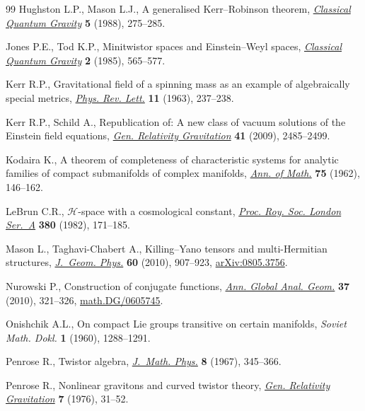 \documentclass[10pt,a4paper]{amsart}
\providecommand{\cal}{\mathcal}
\numberwithin{equation}{section}
\begin{document}
\begin{thebibliography}{99}
Hughston L.P., Mason L.J., A generalised {K}err--{R}obinson theorem,
 \href{http://dx.doi.org/10.1088/0264-9381/5/2/007}{\textit{Classical Quantum Gravity}} \textbf{5} (1988), 275--285.

Jones P.E., Tod K.P., Minitwistor spaces and {E}instein--{W}eyl spaces,
 \href{http://dx.doi.org/10.1088/0264-9381/2/4/021}{\textit{Classical Quantum Gravity}} \textbf{2} (1985), 565--577.

Kerr R.P., Gravitational f\/ield of a spinning mass as an example of
 algebraically special metrics, \href{http://dx.doi.org/10.1103/PhysRevLett.11.237}{\textit{Phys. Rev. Lett.}} \textbf{11} (1963),
 237--238.

Kerr R.P., Schild A., Republication of: {A} new class of vacuum solutions of
 the {E}instein f\/ield equations, \href{http://dx.doi.org/10.1007/s10714-009-0857-z}{\textit{Gen. Relativity Gravitation}}
 \textbf{41} (2009), 2485--2499.

Kodaira K., A theorem of completeness of characteristic systems for analytic
 families of compact submanifolds of complex manifolds, \href{http://dx.doi.org/10.2307/1970424}{\textit{Ann. of Math.}}
 \textbf{75} (1962), 146--162.

LeBrun C.R., {${\cal H}$}-space with a cosmological constant, \href{http://dx.doi.org/10.1098/rspa.1982.0035}{\textit{Proc.
 Roy. Soc. London Ser.~A}} \textbf{380} (1982), 171--185.

Mason L., Taghavi-Chabert A., Killing--{Y}ano tensors and multi-{H}ermitian
 structures, \href{http://dx.doi.org/10.1016/j.geomphys.2010.02.008}{\textit{J.~Geom. Phys.}} \textbf{60} (2010), 907--923,
 \href{http://arxiv.org/abs/0805.3756}{arXiv:0805.3756}.

Nurowski P., Construction of conjugate functions, \href{http://dx.doi.org/10.1007/s10455-009-9186-4}{\textit{Ann. Global Anal.
 Geom.}} \textbf{37} (2010), 321--326, \href{http://arxiv.org/abs/math.DG/0605745}{math.DG/0605745}.

Onishchik A.L., On compact {L}ie groups transitive on certain manifolds,
 \textit{Soviet Math. Dokl.} \textbf{1} (1960), 1288--1291.

Penrose R., Twistor algebra, \href{http://dx.doi.org/10.1063/1.1705200}{\textit{J.~Math. Phys.}} \textbf{8} (1967),
 345--366.

Penrose R., Nonlinear gravitons and curved twistor theory, \href{http://dx.doi.org/10.1007/BF00762011}{\textit{Gen.
 Relativity Gravitation}} \textbf{7} (1976), 31--52.


\end{thebibliography}
\end{document}
